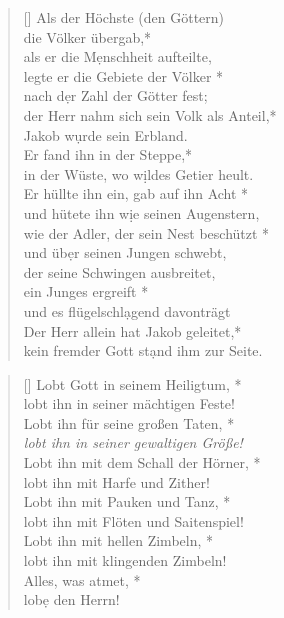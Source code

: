 \begin{verse}[\versewidth]
Als der Höchste (den Göttern) \\ die Völker übergab,*\\
als er die M\d enschheit aufteilte,\\
\vin legte er die Gebiete der Völker *\\
\vin nach d\d er Zahl der Götter fest;\\
der Herr nahm sich sein Volk als Anteil,*\\
Jakob w\d urde sein Erbland.\\
\vin Er fand ihn in der Steppe,*\\
\vin in der Wüste, wo w\d ildes Getier heult.\\
Er hüllte ihn ein, gab auf ihn Acht *\\
und hütete ihn w\d ie seinen Augenstern,\\
\vin wie der Adler, der sein Nest beschützt *\\
\vin und üb\d er seinen Jungen schwebt,\\
der seine Schwingen ausbreitet, \\ein Junges ergreift *\\
und es flügelschl\d agend davonträgt\\
\vin Der Herr allein hat Jakob geleitet,*\\
\vin kein fremder Gott st\d and ihm zur Seite.\\

 
\end{verse}

\vspace{0.3cm}

\def\greinitialformat#1{{\fontsize{40}{40}\selectfont #1}}
\gresetfirstlineaboveinitial{\small \textcolor{red}{Ps 150}}{}
\setaboveinitialseparation{0.72mm}


\vspace{0.3cm}


\begin{verse}[\versewidth]
 Lobt Gott in seinem Heiligtum, *\\
lobt ihn in seiner mächtigen Feste! \\
\vin Lobt ihn für seine großen Taten, *\\
\vin \textit{lobt ihn in seiner gewaltigen Größe!}\\
Lobt ihn mit dem Schall der Hörner, *\\
lobt ihn mit Harfe und Zither! \\
\vin Lobt ihn mit Pauken und Tanz, *\\
\vin lobt ihn mit Flöten und Saitenspiel! \\
Lobt ihn mit hellen Zimbeln, *\\
lobt ihn mit klingenden Zimbeln!\\
\vin Alles, was atmet, *\\
\vin lob\d e den Herrn!\\

\end{verse}


